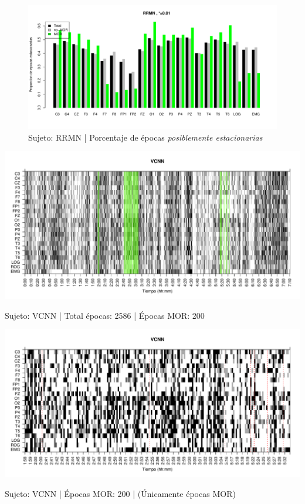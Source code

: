 \begin{figure}
\centering
\includegraphics[width=\linewidth]
{./material_bonito170220/porcentaje_bis/RRMNS_114_1244_1_bar_porcentaje.pdf} 
\caption{Sujeto: RRMN | Porcentaje de \'epocas \textit{posiblemente estacionarias}}
\end{figure}


\begin{SidewaysFigure}
\centering
\includegraphics[width=\linewidth]
{./material_bonito170220/VCNNS1_200_mor200_tot2584_est_total.pdf} 
\caption{Sujeto: VCNN | Total \'epocas: 2586 | \'Epocas MOR: 200}
\end{SidewaysFigure}
\begin{SidewaysFigure}
\centering
\includegraphics[width=\linewidth]
{./material_bonito170220/VCNNS1_200_mor200_tot200_est_mor.pdf} 
\caption{Sujeto: VCNN | \'Epocas MOR: 200 | (\'Unicamente \'epocas MOR)}
\end{SidewaysFigure}

